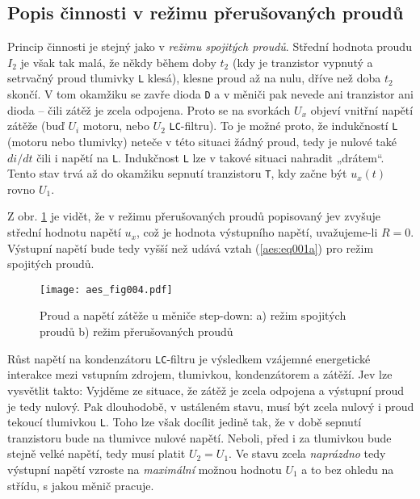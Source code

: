     \subsection{Popis činnosti v režimu přerušovaných proudů}
      Princip činnosti je stejný jako v \emph{režimu spojitých proudů}. Střední hodnota proudu 
      \(I_2\) je však tak malá, že někdy během doby \(t_2\) (kdy je tranzistor vypnutý a setrvačný 
      proud tlumivky \texttt{L} klesá), klesne proud až na nulu, dříve než doba \(t_2\) skončí. V 
      tom okamžiku se zavře dioda \texttt{D} a v měniči pak nevede ani tranzistor ani dioda – čili 
      zátěž je zcela odpojena. Proto se na svorkách \(U_x\) objeví vnitřní napětí zátěže
      (buď \(U_i\) motoru, nebo \(U_2\) \texttt{LC}-filtru). To je možné proto, že indukčností 
      \texttt{L} (motoru nebo tlumivky) neteče v této situaci žádný proud, tedy je nulové také 
      \(di/dt\) čili i napětí na \texttt{L}. Indukčnost \texttt{L} lze v takové situaci nahradit 
      „drátem“. Tento stav trvá až do okamžiku sepnutí tranzistoru \texttt{T}, kdy začne být 
      \(u_x(t)\) rovno \(U_1\).
      
      Z obr. \ref{aes:fig004} je vidět, že v režimu přerušovaných proudů popisovaný jev zvyšuje 
      střední hodnotu napětí \(u_x\), což je hodnota výstupního napětí, uvažujeme-li \(R = 0\). 
      Výstupní napětí bude tedy vyšší než  udává vztah (\ref{aes:eq001a}) pro režim spojitých 
      proudů.
      
      \begin{figure}[ht!]
        \centering
        \texttt{[image: aes\_fig004.pdf]}
        \caption{Proud a napětí zátěže u měniče step-down: a) režim spojitých proudů
                 b) režim přerušovaných proudů}
        \label{aes:fig004}
      \end{figure} 
      Růst napětí na kondenzátoru \texttt{LC}-filtru je výsledkem vzájemné energetické interakce 
      mezi vstupním zdrojem, tlumivkou, kondenzátorem a zátěží. Jev lze vysvětlit takto:
      Vyjděme ze situace, že zátěž je zcela odpojena a výstupní proud je tedy nulový. Pak 
      dlouhodobě, v ustáleném stavu, musí být zcela nulový i proud tekoucí tlumivkou \texttt{L}. 
      Toho lze však docílit jedině tak, že v době sepnutí tranzistoru bude na tlumivce nulové 
      napětí. Neboli, před i za tlumivkou bude stejně velké napětí, tedy musí platit \(U_2 = U_1\). 
      Ve stavu zcela \emph{naprázdno} tedy výstupní napětí vzroste na \emph{maximální} možnou 
      hodnotu \(U_1\) a to bez ohledu na střídu, s jakou měnič pracuje.
      
